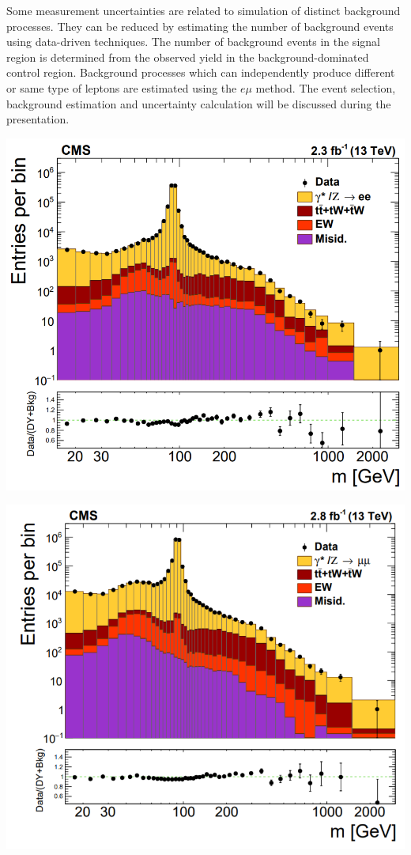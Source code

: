 \documentclass[a4paper,10pt,english]{article}
\begin{document}
Some measurement uncertainties are related to simulation of distinct background processes.
They can be reduced by estimating the number of background events using data-driven techniques.
The number of background events in the signal region is determined from the observed yield in the background-dominated
control region.
Background processes which can independently produce different or same type of leptons are estimated using the $e\mu$ method.
The event selection, background estimation and uncertainty calculation will be discussed during the presentation.

\vspace{0.1cm}
\centering
\begin{minipage}{0.49\textwidth}
	\begin{center}
		\includegraphics[width=.96\linewidth]{Figure1.png}
	\end{center}
\end{minipage}
\hfill
\begin{minipage}{0.49\textwidth}
	\begin{center}
		\includegraphics[width=.99\linewidth]{Figure2.png}
	\end{center}
\end{minipage}
\end{document}
